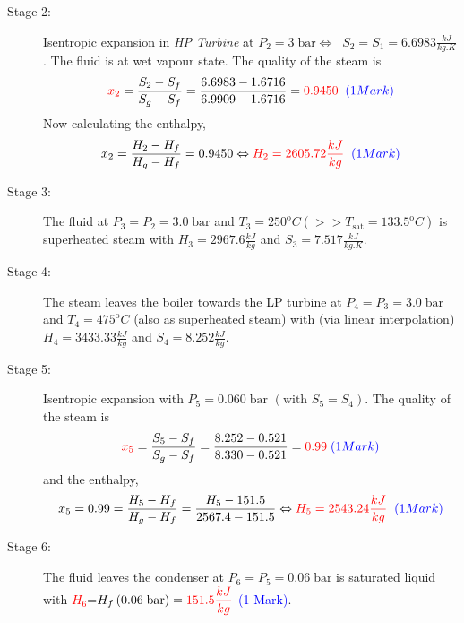 \documentclass[12pt,twoside]{report}
\newcommand{\frc}{\displaystyle\frac}
\begin{document}
\begin{description}
\begin{enumerate}[(a)]
\begin{description}
\item [Stage 2:] Isentropic expansion in {\it HP Turbine} at $P_{2}=3\;\text{bar} \Leftrightarrow \;\; S_{2}=S_{1}=6.6983\frc{kJ}{kg.K}$. The fluid is at wet vapour state. The quality of the steam is
\begin{displaymath}
\textcolor{red}{x_{2}}=\frc{S_{2}-S_{f}}{S_{g}-S_{f}}=\frc{6.6983-1.6716}{6.9909-1.6716}=\textcolor{red}{0.9450}\;\;\textcolor{blue}{(1 Mark)}
\end{displaymath}
Now calculating the enthalpy,
\begin{displaymath}
x_{2}=\frc{H_{2}-H_{f}}{H_{g}-H_{f}}=0.9450 \Leftrightarrow \textcolor{red}{H_{2}=2605.72\frc{kJ}{kg}}\;\;\textcolor{blue}{(1 Mark)}
\end{displaymath}

\item [Stage 3:] The fluid at $P_{3}=P_{2}=3.0\;\text{bar}$ and $T_{3}=250^{\text{o}}C \left(>> T_{\text{sat}}=133.5^{\text{o}}C\right)$ is superheated steam with $H_{3}=2967.6\frc{kJ}{kg}$ and $S_{3}=7.517\frc{kJ}{kg.K}$.

\item [Stage 4:] The steam leaves the boiler towards the LP turbine at $P_{4}=P_{3}=3.0\;\text{bar}$ and $T_{4}=475^{\text{o}}C$ (also as superheated steam) with (via linear interpolation) $H_{4}=3433.33\frc{kJ}{kg}$ and $S_{4}=8.252\frc{kJ}{kg}$.

\item [Stage 5:] Isentropic expansion with $P_{5}=0.060\;\text{bar}$ $\left(\text{with }S_{5}=S_{4}\right)$. The quality of the steam is
\begin{displaymath}
\textcolor{red}{x_{5}}=\frc{S_{5}-S_{f}}{S_{g}-S_{f}}=\frc{8.252-0.521}{8.330-0.521}=\textcolor{red}{0.99}\;\textcolor{blue}{(1 Mark)}
\end{displaymath}
and the enthalpy,
\begin{displaymath}
x_{5}=0.99=\frc{H_{5}-H_{f}}{H_{g}-H_{f}}=\frc{H_{5}-151.5}{2567.4-151.5}\Leftrightarrow \textcolor{red}{H_{5}=2543.24\frc{kJ}{kg}}\;\;\textcolor{blue}{(1 Mark)}
\end{displaymath}

\item [Stage 6:] The fluid leaves the condenser at $P_{6}=P_{5}=0.06\;\text{bar}$ is saturated liquid with \textcolor{red}{$H_{6}$}=$H_{f}\left(0.06\;\text{bar}\right)=\textcolor{red}{151.5\frc{kJ}{kg}}$ \textcolor{blue}{(1 Mark)}.


\end{description}
\end{enumerate}
\end{description}
\end{document}
